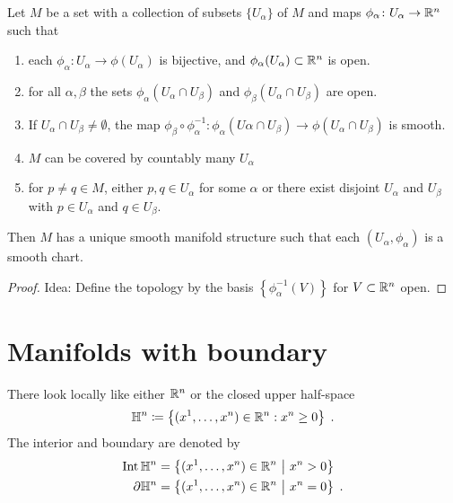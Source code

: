\documentclass{skript}
\begin{document}
\begin{lemma}
    Let $M$ be a set with a collection of subsets $\{U_\alpha\}$ of $M$ and maps $\phi_\alpha\colon U_\alpha \to \mathbb{R}^n$ such that
    \begin{enumerate}
        \item 
            each $\phi_\alpha\colon U_\alpha\to \phi(U_\alpha)$ is bijective, and $\phi_\alpha(U_\alpha)\subset \mathbb{R}^n$ is open.
        \item
            for all $\alpha, \beta$ the sets $\phi_\alpha(U_\alpha\cap U_\beta)$ and $\phi_\beta(U_\alpha\cap U_\beta)$ are open.
        \item
            If $U_\alpha\cap U_\beta \neq \emptyset$, the map $\phi_\beta\circ\phi_\alpha^{-1}\colon \phi_\alpha(U\alpha\cap U_\beta) \to \phi(U_\alpha\cap U_\beta)$ is smooth.
        \item
            $M$ can be covered by countably many $U_\alpha$
        \item
            for $p\neq q\in M$, either $p,q\in U_\alpha$ for some $\alpha$ or there exist disjoint $U_\alpha$ and $U_\beta$ with $p\in U_\alpha$ and $q\in U_\beta$.
    \end{enumerate}
    Then $M$ has a unique smooth manifold structure such that each $(U_\alpha, \phi_\alpha)$ is a smooth chart.
\end{lemma}
\begin{proof}
    Idea: Define the topology by the basis $\left\{\phi_\alpha^{-1}(V)\right\}$ for $V\subset\mathbb{R}^n$ open.
\end{proof}

\section{Manifolds with boundary}
There look locally like either $\mathbb{R}^n$ or the closed upper half-space 
\begin{align*}
    \mathbb{H}^n\coloneqq \left\{(x^1,\dots, x^n)\in \mathbb{R}^n: x^n\geq 0\right\}\;.
\end{align*}
The interior and boundary are denoted by
\begin{align*}
    \operatorname{Int} \mathbb{H}^n   &= \left\{(x^1,\dots, x^n) \in \mathbb{R}^n \ \middle|\  x^n > 0\right\}\\
    \partial \mathbb{H}^n &= \left\{(x^1,\dots, x^n) \in \mathbb{R}^n \ \middle|\  x^n = 0\right\}\;.
\end{align*}
\end{document}
